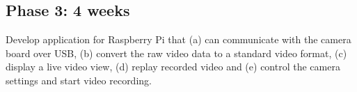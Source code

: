 \documentclass[12pt]{article}
\begin{document}
\subsection*{\normalsize Phase 3: 4 weeks}
Develop application for Raspberry Pi that (a) can communicate with the camera board over USB, (b) convert the raw video data to a standard video format, (c) display a live video view, (d) replay recorded video and (e) control the camera settings and start video recording.
\end{document}
